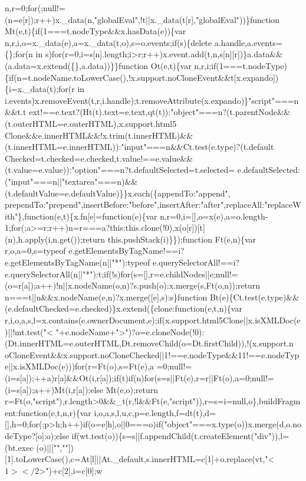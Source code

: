 \begin{DoxyCode}
{       n,r=0;for(;null!=(n=e[r]);r++)x.\_data(n,"globalEval",!t||x.\_data(t[r],"globalEval"))\}function
       Mt(e,t)\{if(1===t.nodeType&&x.hasData(e))\{var n,r,i,o=x.\_data(e),a=x.\_data(t,o),s=o.events;if(s)\{delete
       a.handle,a.events=\{\};for(n in
       s)for(r=0,i=s[n].length;i>r;r++)x.event.add(t,n,s[n][r])\}a.data&&(a.data=x.extend(\{\},a.data))\}\}function Ot(e,t)\{var
       n,r,i;if(1===t.nodeType)\{if(n=t.nodeName.toLowerCase(),!x.support.noCloneEvent&&t[x.expando])\{i=x.\_data(t);for(r in
       i.events)x.removeEvent(t,r,i.handle);t.removeAttribute(x.expando)\}"script"===n&&t.t
      ext!==e.text?(Ht(t).text=e.text,qt(t)):"object"===n?(t.parentNode&&(t.outerHTML=e.outerHTML),x.support.html5
      Clone&&e.innerHTML&&!x.trim(t.innerHTML)&&(t.innerHTML=e.innerHTML)):"input"===n&&Ct.test(e.type)?(t.default
      Checked=t.checked=e.checked,t.value!==e.value&&(t.value=e.value)):"option"===n?t.defaultSelected=t.selected=
      e.defaultSelected:("input"===n||"textarea"===n)&&(t.defaultValue=e.defaultValue)\}\}x.each(\{appendTo:"append",
      prependTo:"prepend",insertBefore:"before",insertAfter:"after",replaceAll:"replaceWith"\},function(e,t)\{x.fn[e]=function(e)\{var
       n,r=0,i=[],o=x(e),a=o.length-1;for(;a>=r;r++)n=r===a?this:this.clone(!0),x(o[r])[t](n),h.apply(i,n.get());return this.pushStack(i)\}\});function Ft(e,n)\{var r,o,a=0,s=typeof
       e.getElementsByTagName!==i?e.getElementsByTagName(n||"*"):typeof
       e.querySelectorAll!==i?e.querySelectorAll(n||"*"):t;if(!s)for(s=[],r=e.childNodes||e;null!=(o=r[a]);a++)!n||x.nodeName(o,n)?s.push(o):x.merge(s,Ft(o,n));return
       n===t||n&&x.nodeName(e,n)?x.merge([e],s):s\}function
       Bt(e)\{Ct.test(e.type)&&(e.defaultChecked=e.checked)\}x.extend(\{clone:function(e,t,n)\{var
       r,i,o,a,s,l=x.contains(e.ownerDocument,e);if(x.support.html5Clone||x.isXMLDoc(e)||!mt.test("<
      "+e.nodeName+">")?o=e.cloneNode(!0):(Dt.innerHTML=e.outerHTML,Dt.removeChild(o=Dt.firstChild)),!(x.support.n
      oCloneEvent&&x.support.noCloneChecked||1!==e.nodeType&&11!==e.nodeType||x.isXMLDoc(e)))for(r=Ft(o),s=Ft(e),a
      =0;null!=(i=s[a]);++a)r[a]&&Ot(i,r[a]);if(t)if(n)for(s=s||Ft(e),r=r||Ft(o),a=0;null!=(i=s[a]);a++)Mt(i,r[a]);else Mt(e,o);return
       r=Ft(o,"script"),r.length>0&&\_t(r,!l&&Ft(e,"script")),r=s=i=null,o\},buildFragment:function(e,t,n,r)\{var
       i,o,a,s,l,u,c,p=e.length,f=dt(t),d=[],h=0;for(;p>h;h++)if(o=e[h],o||0===o)if("object"===x.type(o))x.merge(d,o.nodeType?[o]:o);else
       if(wt.test(o))\{s=s||f.appendChild(t.createElement("div")),l=(bt.exec
      (o)||["",""])[1].toLowerCase(),c=At[l]||At.\_default,s.innerHTML=c[1]+o.replace(vt,"<$1></$2>")+c[2],i=c[0];w
}
\end{DoxyCode}
